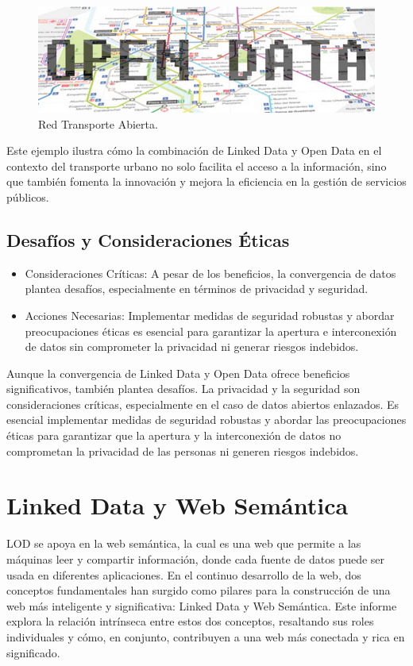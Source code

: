 \documentclass[11pt]{report}
\begin{document}
\begin{figure}[H]
	\centering
	\includegraphics[scale=0.4]{../img/transport.jpg}
	\caption{Red Transporte Abierta.}
	\label{fig:opendata}
\end{figure}

Este ejemplo ilustra cómo la combinación de Linked Data y Open Data en el contexto del transporte urbano no solo facilita el acceso a la información, sino que también fomenta la innovación y mejora la eficiencia en la gestión de servicios públicos.


\section{Desafíos y Consideraciones Éticas}

\begin{itemize}
  \item Consideraciones Críticas: A pesar de los beneficios, la convergencia de datos plantea desafíos, especialmente en términos de privacidad y seguridad.
  \item Acciones Necesarias: Implementar medidas de seguridad robustas y abordar preocupaciones éticas es esencial para garantizar la apertura e interconexión de datos sin comprometer la privacidad ni generar riesgos indebidos.
\end{itemize}
		
		Aunque la convergencia de Linked Data y Open Data ofrece beneficios significativos, también plantea desafíos. La privacidad y la seguridad son consideraciones críticas, especialmente en el caso de datos abiertos enlazados. Es esencial implementar medidas de seguridad robustas y abordar las preocupaciones éticas para garantizar que la apertura y la interconexión de datos no comprometan la privacidad de las personas ni generen riesgos indebidos.
	\chapter{Linked Data y Web Semántica}
	LOD se apoya en la web semántica, la cual es
	una web que permite a las máquinas leer y
	compartir información, donde cada fuente de
	datos puede ser usada en diferentes aplicaciones. 
	En el continuo desarrollo de la web, dos conceptos fundamentales han surgido como pilares para la construcción de una web más inteligente y significativa: Linked Data y Web Semántica. Este informe explora la relación intrínseca entre estos dos conceptos, resaltando sus roles individuales y cómo, en conjunto, contribuyen a una web más conectada y rica en significado.
	
\end{document}
